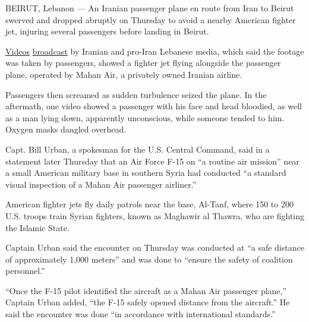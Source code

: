 BEIRUT, Lebanon --- An Iranian passenger plane en route from Iran to
Beirut swerved and dropped abruptly on Thursday to avoid a nearby
American fighter jet, injuring several passengers before landing in
Beirut.

\href{https://www.mashreghnews.ir/news/1098436/\%D9\%81\%DB\%8C\%D9\%84\%D9\%85-\%D8\%A7\%D8\%B3\%D8\%B1\%D8\%A7\%DB\%8C\%DB\%8C\%D9\%84-\%D9\%87\%D9\%88\%D8\%A7\%D9\%BE\%DB\%8C\%D9\%85\%D8\%A7\%DB\%8C-\%D9\%85\%D8\%B3\%D8\%A7\%D9\%81\%D8\%B1\%D8\%A8\%D8\%B1\%DB\%8C-\%D9\%85\%D8\%A7\%D9\%87\%D8\%A7\%D9\%86-\%D8\%B1\%D8\%A7-\%D8\%AA\%D9\%87\%D8\%AF\%DB\%8C\%D8\%AF-\%DA\%A9\%D8\%B1\%D8\%AF}{Videos}
\href{https://www.mashreghnews.ir/news/1098440/\%D9\%81\%DB\%8C\%D9\%84\%D9\%85-\%D9\%84\%D8\%AD\%D8\%B8\%D9\%87-\%D8\%AA\%D9\%87\%D8\%AF\%DB\%8C\%D8\%AF-\%D9\%87\%D9\%88\%D8\%A7\%D9\%BE\%DB\%8C\%D9\%85\%D8\%A7\%DB\%8C-\%D9\%85\%D8\%A7\%D9\%87\%D8\%A7\%D9\%86-\%D8\%AA\%D9\%88\%D8\%B3\%D8\%B7-\%D8\%AF\%D9\%88-\%D8\%AC\%D9\%86\%DA\%AF\%D9\%86\%D8\%AF\%D9\%87-\%D8\%A7\%D8\%B3\%D8\%B1\%D8\%A7\%DB\%8C\%DB\%8C\%D9\%84\%DB\%8C}{broadcast}
by Iranian and pro-Iran Lebanese media, which said the footage was taken
by passengers, showed a fighter jet flying alongside the passenger
plane, operated by Mahan Air, a privately owned Iranian airline.

Passengers then screamed as sudden turbulence seized the plane. In the
aftermath, one video showed a passenger with his face and head bloodied,
as well as a man lying down, apparently unconscious, while someone
tended to him. Oxygen masks dangled overhead.

Capt. Bill Urban, a spokesman for the U.S. Central Command, said in a
statement later Thursday that an Air Force F-15 on ``a routine air
mission'' near a small American military base in southern Syria had
conducted ``a standard visual inspection of a Mahan Air passenger
airliner.''

American fighter jets fly daily patrols near the base, Al-Tanf, where
150 to 200 U.S. troops train Syrian fighters, known as Maghawir al
Thawra, who are fighting the Islamic State.

Captain Urban said the encounter on Thursday was conducted at ``a safe
distance of approximately 1,000 meters'' and was done to ``ensure the
safety of coalition personnel.''

``Once the F-15 pilot identified the aircraft as a Mahan Air passenger
plane,'' Captain Urban added, ``the F-15 safely opened distance from the
aircraft.'' He said the encounter was done ``in accordance with
international standards.''

